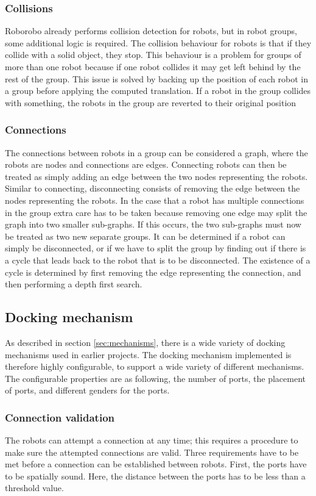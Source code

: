 \subsubsection{Collisions}
Roborobo already performs collision detection for robots, but in robot groups, some additional logic is required.
The collision behaviour for robots is that if they collide with a solid object, they stop.
This behaviour is a problem for groups of more than one robot because if one robot collides it may get left behind by the rest of the group.
This issue is solved by backing up the position of each robot in a group before applying the computed translation.
If a robot in the group collides with something, the robots in the group are reverted to their original position

\subsubsection{Connections}
The connections between robots in a group can be considered a graph, where the robots are nodes and connections are edges.
Connecting robots can then be treated as simply adding an edge between the two nodes representing the robots.
Similar to connecting, disconnecting consists of removing the edge between the nodes representing the robots.
In the case that a robot has multiple connections in the group extra care has to be taken because removing one edge may split the graph into two smaller sub-graphs.
If this occurs, the two sub-graphs must now be treated as two new separate groups.
It can be determined if a robot can simply be disconnected, or if we have to split the group by finding out if there is a cycle that leads back to the robot that is to be disconnected.
The existence of a cycle is determined by first removing the edge representing the connection, and then performing a depth first search.
	 
\subsection{Docking mechanism}
As described in section \ref{sec:mechanisms}, there is a wide variety of docking mechanisms used in earlier projects.
The docking mechanism implemented is therefore highly configurable, to support a wide variety of different mechanisms.
The configurable properties are as following, the number of ports, the placement of ports, and different genders for the ports. 

\subsubsection{Connection validation}
The robots can attempt a connection at any time; this requires a procedure to make sure the attempted connections are valid.
Three requirements have to be met before a connection can be established between robots.
First, the ports have to be spatially sound. 
Here, the distance between the ports has to be less than a threshold value.

